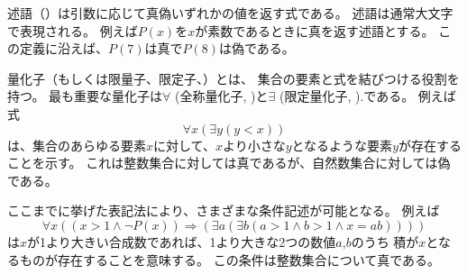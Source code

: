 
\begin{comment}
A \key{predicate} is an expression that is true or false
depending on its parameters.
Predicates are usually denoted by capital letters.
For example, we can define a predicate $P(x)$
that is true exactly when $x$ is a prime number.
Using this definition, $P(7)$ is true but $P(8)$ is false.
\end{comment}

述語（）は引数に応じて真偽いずれかの値を返す式である。
述語は通常大文字で表現される。
例えば$P(x)$を$x$が素数であるときに真を返す述語とする。
この定義に沿えば、$P(7)$は真で$P(8)$は偽である。


\begin{comment}
A \key{quantifier} connects a logical expression
to the elements of a set.
The most important quantifiers are
$\forall$ (\key{for all}) and $\exists$ (\key{there is}).
For example,
\[\forall x (\exists y (y < x))\]
means that for each element $x$ in the set,
there is an element $y$ in the set
such that $y$ is smaller than $x$.
This is true in the set of integers,
but false in the set of natural numbers.
\end{comment}

量化子（もしくは限量子、限定子、）とは、
集合の要素と式を結びつける役割を持つ。
最も重要な量化子は$\forall$ (全称量化子, )と$\exists$ (限定量化子, ).である。
例えば式
\[\forall x (\exists y (y < x))\]
は、集合のあらゆる要素$x$に対して、$x$より小さな$y$となるような要素$y$が存在することを示す。
これは整数集合に対しては真であるが、自然数集合に対しては偽である。

\begin{comment}
Using the notation described above,
we can express many kinds of logical propositions.
For example,
\[\forall x ((x>1 \land \lnot P(x)) \Rightarrow (\exists a (\exists b (a > 1 \land b > 1 \land x = ab))))\]
means that if a number $x$ is larger than 1
and not a prime number,
then there are numbers $a$ and $b$
that are larger than $1$ and whose product is $x$.
This proposition is true in the set of integers.
\end{comment}

ここまでに挙げた表記法により、さまざまな条件記述が可能となる。
例えば
\[\forall x ((x>1 \land \lnot P(x)) \Rightarrow (\exists a (\exists b (a > 1 \land b > 1 \land x = ab))))\]
は$x$が1より大きい合成数であれば、1より大きな2つの数値$a$,$b$のうち
積が$x$となるものが存在することを意味する。
この条件は整数集合について真である。


